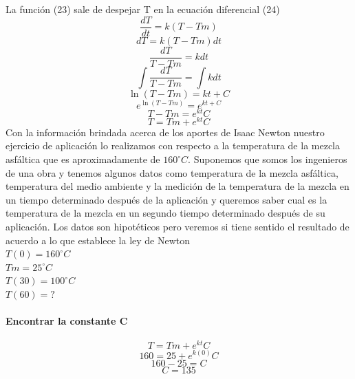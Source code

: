 \documentclass{article}
\begin{document}
La función (23) sale de despejar T en la ecuación diferencial (24)
\begin{equation}
\frac{dT}{dt}=k(T-Tm)
\end{equation}
\begin{equation}
{dT}=k(T-Tm){dt}
\end{equation}
\begin{equation}
\frac{dT}{T-Tm}=k{dt}
\end{equation}
\begin{equation}
\int\frac{dT}{T-Tm}=\int{k{dt}}
\end{equation}
\begin{equation}
\ln{(T-Tm)}={kt} + C
\end{equation}
\begin{equation}
e^{\ln{(T-Tm)}}=e^{kt + C}
\end{equation}
\begin{equation}
{T-Tm}=e^{kt}C
\end{equation}
\begin{equation}
T=Tm + e^{kt}C
\end{equation}
Con la información brindada acerca de los aportes de Isaac Newton nuestro ejercicio de aplicación lo realizamos con respecto a la temperatura de la mezcla asfáltica que es aproximadamente de $160^{\circ} C$. Suponemos que somos los ingenieros de una obra y tenemos algunos datos como temperatura de la mezcla asfáltica, temperatura del medio ambiente y la medición de la temperatura de la mezcla en un tiempo determinado después de la aplicación y queremos saber cual es la temperatura de la mezcla en un segundo tiempo determinado después de su aplicación. Los datos son hipotéticos pero veremos si tiene sentido el resultado de acuerdo a lo que establece la ley de Newton\\
$T(0)=160^{\circ} C$\\
$Tm=25^{\circ} C$\\
$T(30)=100^{\circ} C$\\
$T(60)=?$\\
\paragraph{Encontrar la constante C}
\begin{equation}
T=Tm + e^{kt}C
\end{equation}
\begin{equation}
160=25 + e^{k(0)}C
\end{equation}
\begin{equation}
160-25=C
\end{equation}
\begin{equation}
C=135
\end{equation}
\end{document}
